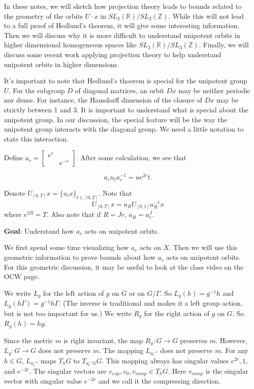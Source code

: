 \documentclass[12pt]{amsart}
\newcommand{\ZZ}{\mathbb{Z}}
\newcommand{\RR}{\mathbb{R}}
\begin{document}
In these notes,  we will sketch how projection theory leads to bounds related to the geometry of the orbits $U \cdot x$ in $SL_2(\RR) / SL_2(\ZZ)$.   While this will not lead to a full proof of Hedlund's theorem, it will give some interesting information.  Then we will discuss why it is more difficult to understand unipotent orbits in higher dimensional homogeneous spaces like $SL_3(\RR) / SL_3(\ZZ)$.  Finally, we will discuss some recent work applying projection theory to help understand unipotent orbits in higher dimensions.

It's important to note that Hedlund's thoerem is special for the unipotent group $U$.   For the subgroup $D$ of diagonal matrices,  an orbit $Dx$ may be neither periodic nor dense.  For instance,  the Hausdorff dimension of the closure of $Dx$ may be strictly between 1 and 3.   It is important to understand what is special about the unipotent group.   In our discussion, the special feature will be the way the unipotent group interacts with the diagonal group.   We need a little notation to state this interaction.

Define $a_r=\begin{bmatrix}
  e^r & \\
    & e^{-r}
\end{bmatrix}$. After some calculation, we see that 

$$a_ru_ta_r^{-1}=u{e^{2r}t}. $$

Denote $U_{[0,T]}x=\{u_tx\}_{t \in [0,T]}$. 
Note that 
$$U_{[0,T]}x=a_RU_{[0,1]} a_R^{-1}x$$
where $e^{2R}=T$. Also note that if $R=Jr$, $a_R=a_r^J$. 

\textbf{Goal}: Understand how $a_r$ acts on unipotent orbits. 

We first spend some time visualizing how $a_r$ acts on $X$.   Then we will use this geometric information to prove bounds about how $a_r$ acts on unipotent orbits.   For this geometric discussion,  it may be useful to look at the class video on the OCW page.

We write $L_g$ for the left action of $g$ on $G$ or on $G/\Gamma$.   So $L_g(h) =g^{-1} h$ and $L_g(h \Gamma) = g^{-1} h \Gamma$.   (The inverse is traditional and makes it a left group action,  but is not too important for us.)
We write $R_g$ for the right action of $g$ on $G$.  So $R_g(h) = h g$.  

Since the metric $m$ is right invariant,  the map $R_g: G \rightarrow G$ preserves $m$.   However,  $L_g: G \rightarrow G$ does not preserve $m$.   The mapping $L_{a_r^{-1}}$ does not preserve $m$.   For any $h \in G$,  $L_{a_r^{-1}}$ maps $T_h G$ to $T_{a_r^{-1} h} G$.   This mapping always has singular values $e^{2r},  1, $ and $e^{-2r}$.   The singular vectors are $v_{exp},  v_0, v_{comp} \in T_h G$.   Here $v_{comp}$ is the singular vector with singular value $e^{-2r}$ and we call it the compressing direction.  
\end{document}
